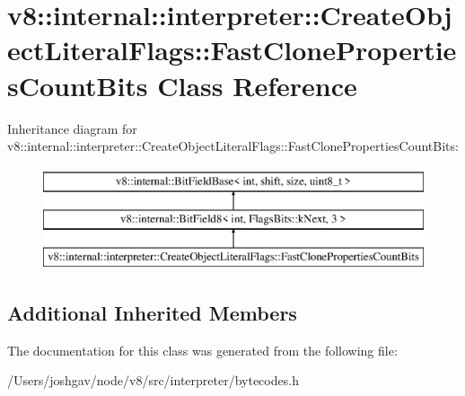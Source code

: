 \hypertarget{classv8_1_1internal_1_1interpreter_1_1_create_object_literal_flags_1_1_fast_clone_properties_count_bits}{}\section{v8\+:\+:internal\+:\+:interpreter\+:\+:Create\+Object\+Literal\+Flags\+:\+:Fast\+Clone\+Properties\+Count\+Bits Class Reference}
\label{classv8_1_1internal_1_1interpreter_1_1_create_object_literal_flags_1_1_fast_clone_properties_count_bits}
Inheritance diagram for v8\+:\+:internal\+:\+:interpreter\+:\+:Create\+Object\+Literal\+Flags\+:\+:Fast\+Clone\+Properties\+Count\+Bits\+:\begin{figure}[H]
\begin{center}
\leavevmode
\includegraphics[height=3.000000cm]{classv8_1_1internal_1_1interpreter_1_1_create_object_literal_flags_1_1_fast_clone_properties_count_bits}
\end{center}
\end{figure}
\subsection*{Additional Inherited Members}


The documentation for this class was generated from the following file\+:\begin{DoxyCompactItemize}
\item 
/\+Users/joshgav/node/v8/src/interpreter/bytecodes.\+h\end{DoxyCompactItemize}
